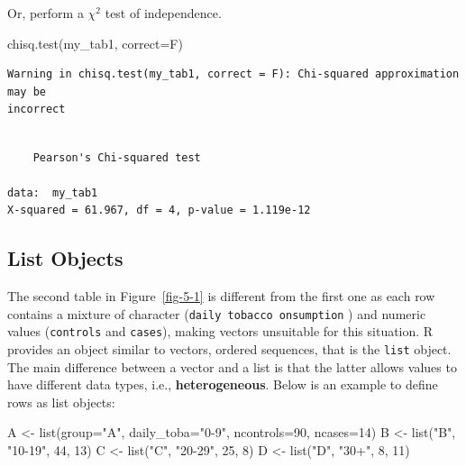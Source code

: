 \documentclass[
  letterpaper,
  DIV=11,
  numbers=noendperiod]{scrreprt}
\newenvironment{Shaded}{\begin{snugshade}}{\end{snugshade}}
\newcommand{\AttributeTok}[1]{\textcolor[rgb]{0.40,0.45,0.13}{#1}}
\newcommand{\DecValTok}[1]{\textcolor[rgb]{0.68,0.00,0.00}{#1}}
\newcommand{\FunctionTok}[1]{\textcolor[rgb]{0.28,0.35,0.67}{#1}}
\newcommand{\NormalTok}[1]{\textcolor[rgb]{0.00,0.23,0.31}{#1}}
\newcommand{\OtherTok}[1]{\textcolor[rgb]{0.00,0.23,0.31}{#1}}
\newcommand{\StringTok}[1]{\textcolor[rgb]{0.13,0.47,0.30}{#1}}
\begin{document}
Or, perform a \(\chi^{2}\) test of independence.

\begin{Shaded}
\begin{Highlighting}[]
\FunctionTok{chisq.test}\NormalTok{(my\_tab1, }\AttributeTok{correct=}\NormalTok{F)}
\end{Highlighting}
\end{Shaded}

\begin{verbatim}
Warning in chisq.test(my_tab1, correct = F): Chi-squared approximation may be
incorrect
\end{verbatim}

\begin{verbatim}

    Pearson's Chi-squared test

data:  my_tab1
X-squared = 61.967, df = 4, p-value = 1.119e-12
\end{verbatim}

\subsection{List Objects}\label{sec-05-list-objects}

The second table in Figure~\ref{fig-5-1} is different from the first one
as each row contains a mixture of character
(\texttt{daily\ tobacco\ onsumption} ) and numeric values
(\texttt{controls} and \texttt{cases}), making vectors unsuitable for
this situation. R provides an object similar to vectors, ordered
sequences, that is the \texttt{list} object. The main difference between
a vector and a list is that the latter allows values to have different
data types, i.e., \textbf{heterogeneous}. Below is an example to define
rows as list objects:

\begin{Shaded}
\begin{Highlighting}[]
\NormalTok{A }\OtherTok{\textless{}{-}} \FunctionTok{list}\NormalTok{(}\AttributeTok{group=}\StringTok{"A"}\NormalTok{, }\AttributeTok{daily\_toba=}\StringTok{"0{-}9"}\NormalTok{, }\AttributeTok{ncontrols=}\DecValTok{90}\NormalTok{, }\AttributeTok{ncases=}\DecValTok{14}\NormalTok{)}
\NormalTok{B }\OtherTok{\textless{}{-}} \FunctionTok{list}\NormalTok{(}\StringTok{"B"}\NormalTok{, }\StringTok{"10{-}19"}\NormalTok{, }\DecValTok{44}\NormalTok{, }\DecValTok{13}\NormalTok{)}
\NormalTok{C }\OtherTok{\textless{}{-}} \FunctionTok{list}\NormalTok{(}\StringTok{"C"}\NormalTok{, }\StringTok{"20{-}29"}\NormalTok{, }\DecValTok{25}\NormalTok{, }\DecValTok{8}\NormalTok{)}
\NormalTok{D }\OtherTok{\textless{}{-}} \FunctionTok{list}\NormalTok{(}\StringTok{"D"}\NormalTok{, }\StringTok{"30+"}\NormalTok{, }\DecValTok{8}\NormalTok{, }\DecValTok{11}\NormalTok{)}
\end{Highlighting}
\end{Shaded}
\end{document}
